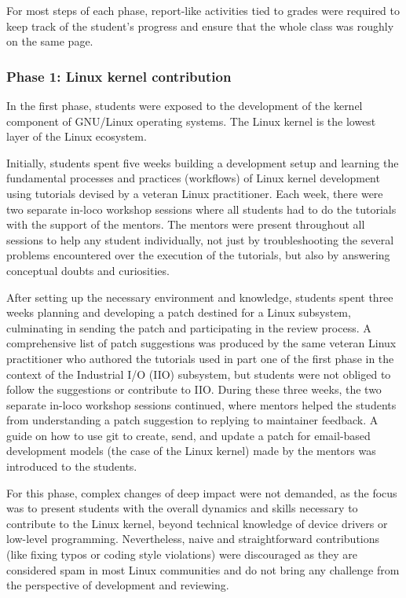 For most steps of each phase, report-like activities tied to grades were
required to keep track of the student's progress and ensure that the whole class
was roughly on the same page.

\subsubsection{\textbf{Phase 1:} Linux kernel contribution}

In the first phase, students were exposed to the development of the kernel
component of GNU/Linux operating systems. The Linux kernel is the lowest layer
of the Linux ecosystem.

Initially, students spent five weeks building a development setup and learning
the fundamental processes and practices (workflows) of Linux kernel development
using tutorials devised by a veteran Linux practitioner. Each week, there were
two separate in-loco workshop sessions where all students had to do the
tutorials with the support of the mentors. The mentors were present throughout
all sessions to help any student individually, not just by troubleshooting the
several problems encountered over the execution of the tutorials, but also by
answering conceptual doubts and curiosities.

After setting up the necessary environment and knowledge, students spent three
weeks planning and developing a patch destined for a Linux subsystem,
culminating in sending the patch and participating in the review process. A
comprehensive list of patch suggestions was produced by the same veteran Linux
practitioner who authored the tutorials used in part one of the first phase in
the context of the Industrial I/O (IIO) subsystem, but students were not obliged
to follow the suggestions or contribute to IIO. During these three weeks, the
two separate in-loco workshop sessions continued, where mentors helped the
students from understanding a patch suggestion to replying to maintainer
feedback. A guide on how to use git to create, send, and update a patch for
email-based development models (the case of the Linux kernel) made by the
mentors was introduced to the students.

For this phase, complex changes of deep impact were not demanded, as the focus
was to present students with the overall dynamics and skills necessary to
contribute to the Linux kernel, beyond technical knowledge of device drivers or
low-level programming. Nevertheless, naive and straightforward contributions
(like fixing typos or coding style violations) were discouraged as they are
considered spam in most Linux communities and do not bring any challenge from
the perspective of development and reviewing.

